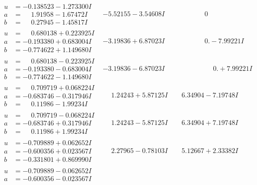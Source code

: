 \documentclass[1p]{elsarticle_modified}
\theoremstyle{definition}
\begin{document}
$$\begin{array}{c|c|c}
 \hline 
\begin{aligned}
u &= -0.138523 - 1.273300 I \\
a &= \phantom{-}1.91958 - 1.67472 I \\
b &= \phantom{-}0.27945 - 1.45817 I\end{aligned}
 & -5.52155 - 3.54608 I & \phantom{-0.000000 } 0 \\ \hline\begin{aligned}
u &= \phantom{-}0.680138 + 0.223925 I \\
a &= -0.193380 + 0.683004 I \\
b &= -0.774622 + 1.149680 I\end{aligned}
 & -3.19836 + 6.87023 I & \phantom{-0.000000 } 0. - 7.99221 I \\ \hline\begin{aligned}
u &= \phantom{-}0.680138 - 0.223925 I \\
a &= -0.193380 - 0.683004 I \\
b &= -0.774622 - 1.149680 I\end{aligned}
 & -3.19836 - 6.87023 I & \phantom{-0.000000 -}0. + 7.99221 I \\ \hline\begin{aligned}
u &= \phantom{-}0.709719 + 0.068224 I \\
a &= -0.683746 - 0.317946 I \\
b &= \phantom{-}0.11986 - 1.99234 I\end{aligned}
 & \phantom{-}1.24243 + 5.87125 I & \phantom{-}6.34904 - 7.19748 I \\ \hline\begin{aligned}
u &= \phantom{-}0.709719 - 0.068224 I \\
a &= -0.683746 + 0.317946 I \\
b &= \phantom{-}0.11986 + 1.99234 I\end{aligned}
 & \phantom{-}1.24243 - 5.87125 I & \phantom{-}6.34904 + 7.19748 I \\ \hline\begin{aligned}
u &= -0.709889 + 0.062652 I \\
a &= -0.600356 + 0.023567 I \\
b &= -0.331801 + 0.869990 I\end{aligned}
 & \phantom{-}2.27965 - 0.78103 I & \phantom{-}5.12667 + 2.33382 I \\ \hline\begin{aligned}
u &= -0.709889 - 0.062652 I \\
a &= -0.600356 - 0.023567 I \\

\end{aligned}
\end{array}$$
\end{document}
